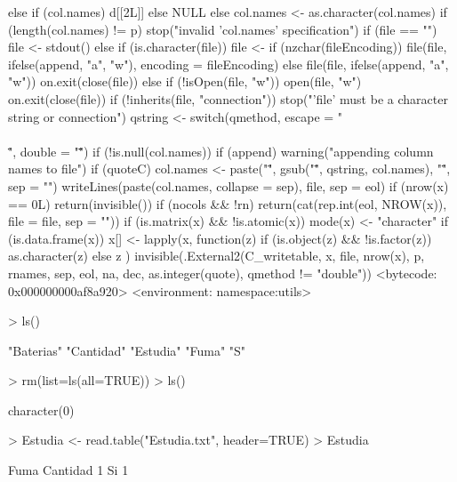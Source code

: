 \documentclass{article}
\begin{document}
\begin{Schunk}
\begin{Soutput}
{{        else if (col.names) 
            d[[2L]]
        else NULL
    }
    else {
        col.names <- as.character(col.names)
        if (length(col.names) != p) 
            stop("invalid 'col.names' specification")
    }
    if (file == "") 
        file <- stdout()
    else if (is.character(file)) {
        file <- if (nzchar(fileEncoding)) 
            file(file, ifelse(append, "a", "w"), encoding = fileEncoding)
        else file(file, ifelse(append, "a", "w"))
        on.exit(close(file))
    }
    else if (!isOpen(file, "w")) {
        open(file, "w")
        on.exit(close(file))
    }
    if (!inherits(file, "connection")) 
        stop("'file' must be a character string or connection")
    qstring <- switch(qmethod, escape = "\\\\\"", double = "\"\"")
    if (!is.null(col.names)) {
        if (append) 
            warning("appending column names to file")
        if (quoteC) 
            col.names <- paste("\"", gsub("\"", qstring, col.names), 
                "\"", sep = "")
        writeLines(paste(col.names, collapse = sep), file, sep = eol)
    }
    if (nrow(x) == 0L) 
        return(invisible())
    if (nocols && !rn) 
        return(cat(rep.int(eol, NROW(x)), file = file, sep = ""))
    if (is.matrix(x) && !is.atomic(x)) 
        mode(x) <- "character"
    if (is.data.frame(x)) {
        x[] <- lapply(x, function(z) {
            if (is.object(z) && !is.factor(z)) 
                as.character(z)
            else z
        })
    }
    invisible(.External2(C_writetable, x, file, nrow(x), p, rnames, 
        sep, eol, na, dec, as.integer(quote), qmethod != "double"))
}
<bytecode: 0x000000000af8a920>
<environment: namespace:utils>
\end{Soutput}
\begin{Sinput}
> ls()
\end{Sinput}
\begin{Soutput}
[1] "Baterias" "Cantidad" "Estudia"  "Fuma"     "S"       
\end{Soutput}
\begin{Sinput}
> rm(list=ls(all=TRUE))
> ls()
\end{Sinput}
\begin{Soutput}
character(0)
\end{Soutput}
\begin{Sinput}
> Estudia <- read.table("Estudia.txt", header=TRUE)
> Estudia
\end{Sinput}
\begin{Soutput}
   Fuma Cantidad
1    Si        1

\end{Soutput}
\end{Schunk}
\end{document}
